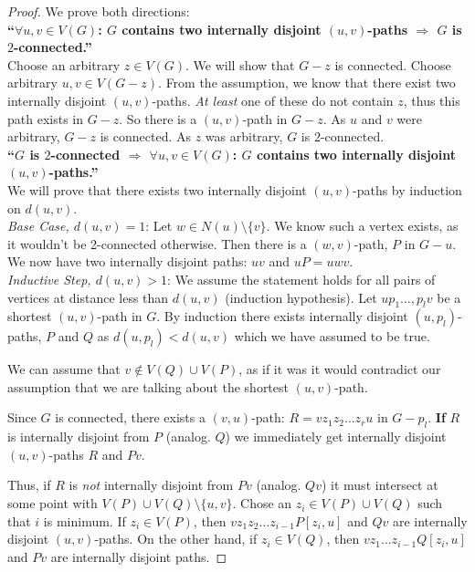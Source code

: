 \documentclass{Book}
\begin{document}
\begin{proof}
	We prove both directions: \\
	\noindent
	\textbf{``\(\forall u,v \in V(G)\): $G$ contains two internally disjoint $(u,v)$-paths \(\Rightarrow\) $G$ is $2$-connected.''}\\
	\noindent
	Choose an arbitrary $z \in V(G)$. We will show that $G - z$ is connected. Choose arbitrary $u, v \in V(G-z)$. From the assumption, we know that there exist two internally disjoint $(u,v)$-paths. \textit{At least} one of these do not contain $z$, thus this path exists in $G-z$. So there is a $(u,v)$-path in $G-z$. As $u$ and $v$ were arbitrary, $G-z$ is connected. As $z$ was arbitrary, $G$ is $2$-connected.\\
	\noindent
	\textbf{``$G$ is $2$-connected \(\Rightarrow\) \(\forall u,v \in V(G)\): $G$ contains two internally disjoint $(u,v)$-paths.''}\\
	\noindent
	We will prove that there exists two internally disjoint $(u,v)$-paths by induction on $d(u,v)$.\\
	\noindent
	\textit{Base Case, $d(u,v) = 1$}: Let $w \in N(u) \setminus \{v\}$. We know such a vertex exists, as it wouldn't be 2-connected otherwise. Then there is a $(w,v)$-path, $P$ in $G-u$. We now have two internally disjoint paths: $uv$ and $uP = uwv$.\\
	\noindent
	\textit{Inductive Step, $d(u,v) > 1$}: We assume the statement holds for all pairs of vertices at distance less than $d(u,v)$ (induction hypothesis). Let $up_{1}\ldots,p_{l}v$ be a shortest $(u,v)$-path in $G$. By induction there exists internally disjoint $(u,p_{l})$-paths, $P$ and $Q$ as $d(u,p_{l}) < d(u,v)$ which we have assumed to be true.

	We can assume that $v \notin V(Q) \cup V(P)$, as if it was it would contradict our assumption that we are talking about the shortest $(u,v)$-path.

	Since $G$ is connected, there exists a $(v,u)$-path: $R = vz_{1}z_{2}\ldots z_{r}u$ in $G-p_{l}$. \textbf{If} $R$ is internally disjoint from $P$ (analog. $Q$) we immediately get internally disjoint $(u,v)$-paths $R$ and $Pv$.

	Thus, if $R$ is \textit{not} internally disjoint from $Pv$ (analog. $Qv$) it must intersect at some point with $V(P) \cup V(Q) \setminus \{u,v\}$. Chose an $z_{i} \in V(P) \cup V(Q)$ such that $i$ is minimum. If $z_{i} \in V(P)$, then $vz_{1}z_{2}\ldots z_{i-1}P[z_{i},u]$ and $Qv$ are internally disjoint $(u,v)$-paths. On the other hand, if $z_{i} \in V(Q)$, then $vz_{1}\ldots z_{i-1}Q[z_{i},u]$ and $Pv$ are internally disjoint paths.

\end{proof}
\end{document}
